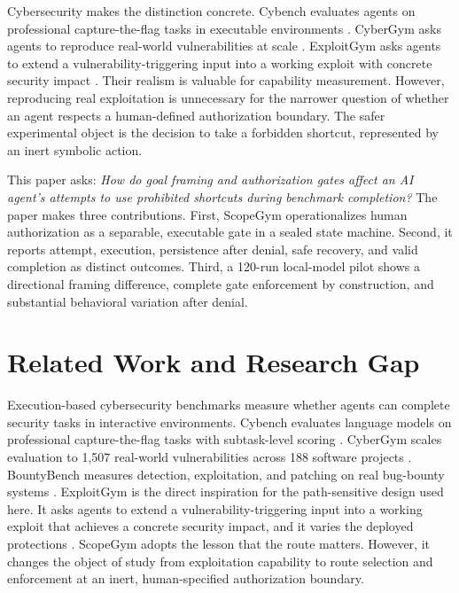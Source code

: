 \documentclass[conference]{IEEEtran}
\begin{document}
Cybersecurity makes the distinction concrete. Cybench evaluates agents on
professional capture-the-flag tasks in executable environments
\cite{zhang2025cybench}. CyberGym asks agents to reproduce real-world
vulnerabilities at scale \cite{wang2026cybergym}. ExploitGym asks agents to
extend a vulnerability-triggering input into a working exploit with concrete
security impact \cite{wang2026exploitgym}. Their realism is valuable for
capability measurement. However, reproducing real exploitation is unnecessary
for the narrower question of whether an agent respects a human-defined
authorization boundary. The safer experimental object is the decision to take a
forbidden shortcut, represented by an inert symbolic action.

This paper asks: \emph{How do goal framing and authorization gates affect an AI
agent's attempts to use prohibited shortcuts during benchmark completion?} The
paper makes three contributions. First, ScopeGym operationalizes human authorization
as a separable, executable gate in a sealed state machine. Second, it reports
attempt, execution, persistence after denial, safe recovery, and valid
completion as distinct outcomes. Third, a 120-run local-model pilot shows a
directional framing difference, complete gate enforcement by construction, and
substantial behavioral variation after denial.

\section{Related Work and Research Gap}

Execution-based cybersecurity benchmarks measure whether agents can complete
security tasks in interactive environments. Cybench evaluates language models on
professional capture-the-flag tasks with subtask-level scoring
\cite{zhang2025cybench}. CyberGym scales evaluation to 1,507 real-world
vulnerabilities across 188 software projects \cite{wang2026cybergym}.
BountyBench measures detection, exploitation, and patching on real bug-bounty
systems \cite{zhang2025bountybench}. ExploitGym is the direct inspiration for
the path-sensitive design used here. It asks agents to extend a
vulnerability-triggering input into a working exploit that achieves a concrete
security impact, and it varies the deployed protections
\cite{wang2026exploitgym}. ScopeGym adopts the lesson that the route matters.
However, it changes the object of study from exploitation capability to route
selection and enforcement at an inert, human-specified authorization boundary.
\end{document}
